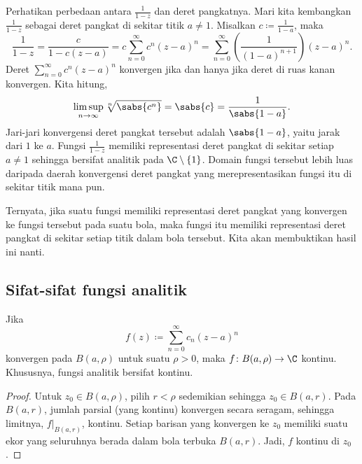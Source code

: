 \begin{example}
Perhatikan perbedaan antara $\frac{1}{1-z}$ dan deret pangkatnya.  Mari kita
kembangkan $\frac{1}{1-z}$ sebagai deret pangkat di sekitar titik $a \neq 1$.
Misalkan $c \coloneqq \frac{1}{1-a}$, maka
\begin{equation*}
\frac{1}{1-z} =
\frac{c}{1-c(z-a)}
=
c
\sum_{n=0}^\infty c^{n} {(z-a)}^n
=
\sum_{n=0}^\infty \left( \frac{1}{{(1-a)}^{n+1}} \right) {(z-a)}^n .
\end{equation*}
Deret $\sum_{n=0}^\infty c^n {(z-a)}^n$ konvergen jika dan hanya jika
deret di ruas kanan konvergen.  Kita hitung,
\begin{equation*}
\limsup_{n\to\infty}
\sqrt[n]{\sabs{c^n}} = \sabs{c}
= \frac{1}{\sabs{1-a}} .
\end{equation*}
Jari-jari konvergensi deret pangkat tersebut adalah $\sabs{1-a}$, yaitu
jarak dari $1$ ke $a$.  Fungsi $\frac{1}{1-z}$
memiliki representasi deret pangkat
di sekitar setiap $a \neq 1$ sehingga bersifat analitik pada $\C \setminus
\{ 1 \}$.
Domain fungsi tersebut lebih luas daripada daerah
konvergensi deret pangkat yang merepresentasikan fungsi itu di sekitar titik mana pun.
\end{example}

Ternyata,
jika suatu fungsi memiliki representasi deret pangkat yang konvergen ke fungsi tersebut
pada suatu bola,
maka fungsi itu memiliki representasi deret pangkat di sekitar setiap titik dalam bola tersebut.  Kita akan membuktikan
hasil ini nanti.

\subsection{Sifat-sifat fungsi analitik}

\begin{prop}
Jika
\begin{equation*}
f(z) \coloneqq \sum_{n=0}^\infty c_n {(z-a)}^n
\end{equation*}
konvergen pada $B(a,\rho)$ untuk suatu $\rho > 0$, maka
$f \colon B(a,\rho) \to \C$ kontinu.
Khususnya, fungsi analitik bersifat kontinu.
\end{prop}

\begin{proof}
Untuk $z_0 \in B(a,\rho)$, pilih $r < \rho$ sedemikian sehingga $z_0 \in B(a,r)$.
Pada $B(a,r)$,
jumlah parsial (yang kontinu) konvergen secara seragam,
sehingga limitnya, $f|_{B(a,r)}$, kontinu.
Setiap barisan yang konvergen ke
$z_0$ memiliki suatu ekor yang seluruhnya berada dalam bola terbuka $B(a,r)$.
Jadi, $f$ kontinu di $z_0$.
\end{proof}

